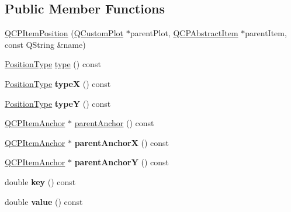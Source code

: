 \subsection*{Public Member Functions}
\begin{DoxyCompactItemize}
\item 
\hyperlink{classQCPItemPosition_a6519a552bd9766354644ec24d1f26622}{Q\+C\+P\+Item\+Position} (\hyperlink{classQCustomPlot}{Q\+Custom\+Plot} $\ast$parent\+Plot, \hyperlink{classQCPAbstractItem}{Q\+C\+P\+Abstract\+Item} $\ast$parent\+Item, const Q\+String \&name)
\item 
\hyperlink{classQCPItemPosition_aad9936c22bf43e3d358552f6e86dbdc8}{Position\+Type} \hyperlink{classQCPItemPosition_aecb709d72c9aa334a7f62e2c9e0b5d60}{type} () const 
\item 
\hyperlink{classQCPItemPosition_aad9936c22bf43e3d358552f6e86dbdc8}{Position\+Type} {\bfseries typeX} () const \hypertarget{classQCPItemPosition_a3cb68cf9c95be05c66a0f47448e328e5}{}\label{classQCPItemPosition_a3cb68cf9c95be05c66a0f47448e328e5}

\item 
\hyperlink{classQCPItemPosition_aad9936c22bf43e3d358552f6e86dbdc8}{Position\+Type} {\bfseries typeY} () const \hypertarget{classQCPItemPosition_a8a2fec9dec1ce006a598b32685fd7ab3}{}\label{classQCPItemPosition_a8a2fec9dec1ce006a598b32685fd7ab3}

\item 
\hyperlink{classQCPItemAnchor}{Q\+C\+P\+Item\+Anchor} $\ast$ \hyperlink{classQCPItemPosition_a7b4ffab9946945c0e11cd2352dc2e042}{parent\+Anchor} () const 
\item 
\hyperlink{classQCPItemAnchor}{Q\+C\+P\+Item\+Anchor} $\ast$ {\bfseries parent\+AnchorX} () const \hypertarget{classQCPItemPosition_a485abba71c8552086c5f68e95dca7f9a}{}\label{classQCPItemPosition_a485abba71c8552086c5f68e95dca7f9a}

\item 
\hyperlink{classQCPItemAnchor}{Q\+C\+P\+Item\+Anchor} $\ast$ {\bfseries parent\+AnchorY} () const \hypertarget{classQCPItemPosition_a1502dba801cb20424b7e097399e372de}{}\label{classQCPItemPosition_a1502dba801cb20424b7e097399e372de}

\item 
double {\bfseries key} () const \hypertarget{classQCPItemPosition_ac3cb2bddf5f89e5181830be30b93d090}{}\label{classQCPItemPosition_ac3cb2bddf5f89e5181830be30b93d090}

\item 
double {\bfseries value} () const \hypertarget{classQCPItemPosition_a6817f7356d3a2b63e8446c6b6106dae1}{}\label{classQCPItemPosition_a6817f7356d3a2b63e8446c6b6106dae1}


\end{DoxyCompactItemize}
